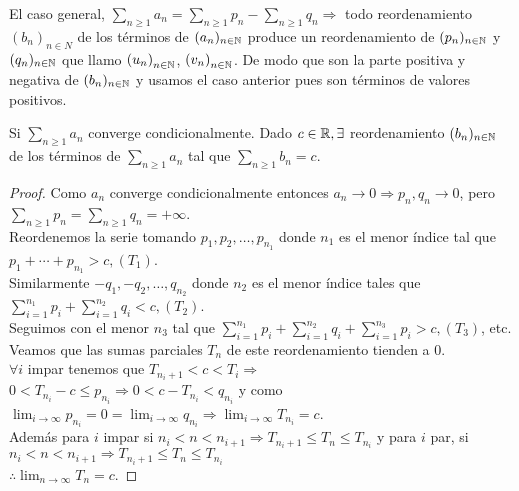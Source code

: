 El caso general, \(\sum_{n \geq 1} a_n = \sum_{n \geq 1} p_n - \sum_{n \geq 1} q_n \Rightarrow \) todo reordenamiento \((b_n)_{n \in N} \) de los términos de \((a_n)_{n \in \mathbb{N}} \) produce un reordenamiento de \((p_n)_{n \in \mathbb{N}} \) y \((q_n)_{n \in \mathbb{N}} \) que llamo \({(u_n)}_{n \in \mathbb{N}} \), \({(v_n)}_{n \in \mathbb{N}} \). De modo que son la parte positiva y negativa de \((b_n)_{n \in \mathbb{N}} \) y usamos el caso anterior pues son términos de valores positivos.

\begin{theorem}
  Si \(\sum_{n \geq 1} a_n\) converge condicionalmente. Dado \(c \in \mathbb{R}, \exists \) reordenamiento \((b_n)_{n \in \mathbb{N}} \) de los términos de \(\sum_{n \geq 1} a_n\) tal que \(\sum_{n \geq 1} b_n = c\).
  \begin{proof}
    Como \(a_n\) converge condicionalmente entonces \(a_n \to 0 \Rightarrow p_n, q_n \to 0\), pero \(\sum_{n \geq 1} p_n = \sum_{n \geq 1} q_n = +\infty\). \\
    Reordenemos la serie tomando \(p_1, p_2, \ldots, p_{n_1} \) donde \(n_1\) es el menor índice tal que \(p_1 + \cdots + p_{n_1} > c, (T_1)\). \\
    Similarmente \(-q_1, -q_2, \ldots, q_{n_2} \) donde \(n_2\) es el menor índice tales que \(\sum_{i = 1}^{n_1} p_i + \sum_{i = 1}^{n_2} q_i < c, (T_2)\). \\
    Seguimos con el menor \(n_3\) tal que \(\sum_{i = 1}^{n_1} p_i + \sum_{i = 1}^{n_2} q_i + \sum_{i = 1}^{n_3} p_i > c, (T_3)\), etc. \\
    Veamos que las sumas parciales \(T_n\) de este reordenamiento tienden a 0. \\
    \(\forall i\) impar tenemos que \(T_{n_i +1} < c < T_i \Rightarrow \) \\
    \(0 < T_{n_i} - c \leq p_{n_i} \Rightarrow 0 < c - T_{n_i} < q_{n_i} \) y como \(\lim_{i \to \infty} p_{n_i} = 0 = \lim_{i \to \infty} q_{n_i} \Rightarrow \lim_{i \to \infty} T_{n_i} = c\). \\
    Además para \(i\) impar si \(n_i < n < n_{i+1} \Rightarrow T_{n_i+1} \leq T_n \leq T_{n_i} \) y para \(i\) par, si \(n_i < n < n_{i+1} \Rightarrow T_{n_i+1} \leq T_n \leq T_{n_i} \) \\
    \(\therefore \lim_{n \to \infty} T_n = c\).
  \end{proof}
\end{theorem}
